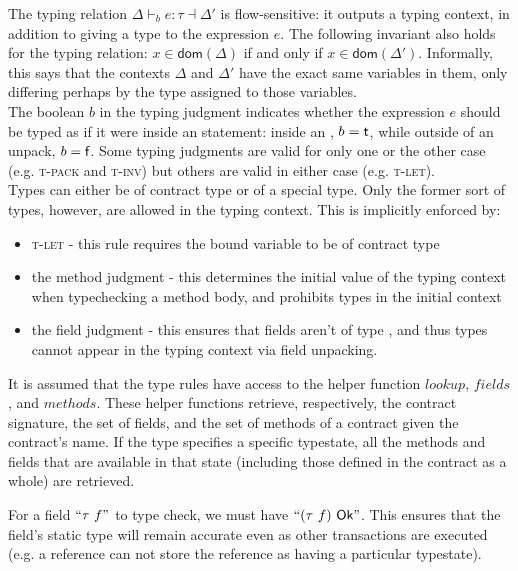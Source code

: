 \documentclass[runningheads,a4paper]{llncs}
\begin{document}
The typing relation $\Delta \vdash_{b} e : \tau \dashv \Delta'$ is flow-sensitive: it outputs a typing context, in addition to giving a type to the expression $e$. The following invariant also holds for the typing relation: $x \in \textsf{dom}(\Delta)$ if and only if $x \in \textsf{dom}(\Delta')$. Informally, this says that the contexts $\Delta$ and $\Delta'$ have the exact same variables in them, only differing perhaps by the type assigned to those variables.\\

The boolean $b$ in the typing judgment indicates whether the expression $e$ should be typed as if it were inside an \unpackS{} statement: inside an \unpackS{}, $b = \textsf{t}$, while outside of an unpack, $b = \textsf{f}$. Some typing judgments are valid for only one or the other case (e.g. \textsc{t-pack} and \textsc{t-inv}) but others are valid in either case (e.g. \textsc{t-let}).\\

Types can either be of contract type or of a special \packS{} type. Only the former sort of types, however, are allowed in the typing context. This is implicitly enforced by:

\begin{itemize}
\item \textsc{t-let} - this rule requires the bound variable to be of contract type
\item the method \okS{} judgment - this determines the initial value of the typing context when typechecking a method body, and prohibits \packS{} types in the initial context
\item the field \okS{} judgment - this ensures that fields aren't of type \packS{}, and thus \packS{} types cannot appear in the typing context via field unpacking.
\end{itemize}

It is assumed that the type rules have access to the helper function $lookup$, $fields$, and $methods$. These helper functions retrieve, respectively, the contract signature, the set of fields, and the set of methods of a contract given the contract's name. If the type specifies a specific typestate, all the methods and fields that are available in that state (including those defined in the contract as a whole) are retrieved.\\

\iffalse

For a field $``\tau\ f"$ to type check, we must have $``(\tau\ f)\ \okS"$. This ensures that the field's static type will remain accurate even as other transactions are executed (e.g. a \readonlyS{} reference can not store the reference as having a particular typestate). \\
\end{document}
